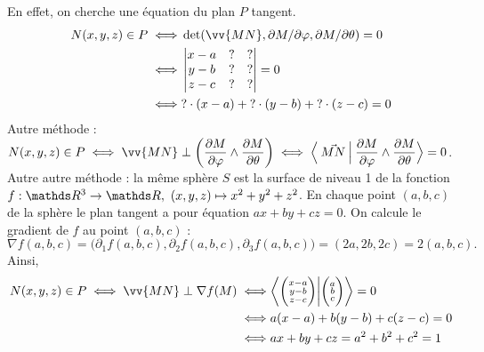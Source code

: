 \begin{exm}
	En effet, on cherche une équation du plan $P$ tangent.
	\begin{align*}
		N(x,y,z) \in P \iff& \det(\vv{MN}, \partial M / \partial \varphi, \partial M / \partial \theta) = 0 \\
		\iff&
		\begin{vmatrix}
			x - a& ? & ?\\
			y - b& ? & ?\\
			z - c& ? & ?
		\end{vmatrix} = 0\\
		\iff& {?} \cdot (x-a) + {?} \cdot (y -b) + {?}\cdot (z-c) = 0 \\
	\end{align*}
	Autre méthode : \hfill $\ds N(x,y,z) \in P \iff \vv{MN} \perp \left( \frac{\partial M}{\partial \varphi} \land \frac{\partial M}{\partial \theta} \right) \iff \Big<\:\vec{MN}\:\Big|\: \frac{\partial M}{\partial \varphi} \land \frac{\partial M}{\partial \theta}\Big> = 0$. \hfill\null\\
	Autre autre méthode : la même sphère $S$ est la surface de niveau 1 de la fonction $f : \R^3 \to \R,\ (x,y,z) \mapsto x^2+y^2+z^2$.
	En chaque point $(a,b,c)$ de la sphère le plan tangent a pour équation $ax + by + cz = 0$.
	On calcule le gradient de $f$ au point $(a,b,c)$ : \[
		\nabla f(a,b,c) = \big(\partial_1 f(a,b,c), \partial_2 f(a,b,c), \partial_3 f(a,b,c)\big)
		= (2a, 2b, 2c) = 2(a,b,c)
	.\]
	Ainsi,
	\begin{align*}
		N(x,y,z) \in P \iff \vv{MN} \perp \nabla f(M) \iff& \bigg<\bigg(\substack{x-a\\y-b\\z-c}\bigg)\bigg|\bigg(\substack{a\\b\\c}\bigg)\bigg> = 0\\
		\iff& a(x-a) + b(y-b) + c(z-c) = 0\\
		\iff& ax + by + cz = a^2 + b^2 + c^2 = 1
	\end{align*}
\end{exm}
